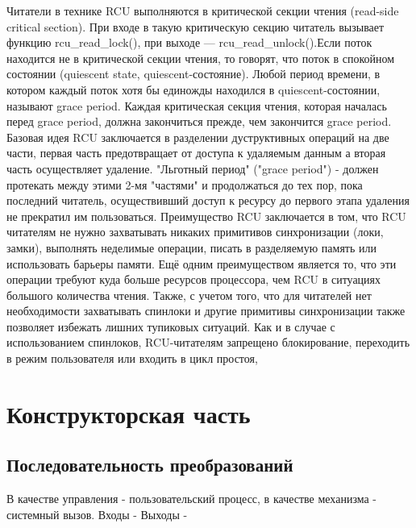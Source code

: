 \documentclass{bmstu}
\begin{document}
Читатели в технике RCU выполняются в критической секции чтения (read-side critical section). При входе в такую критическую секцию читатель вызывает функцию rcu\_read\_lock(), при выходе — rcu\_read\_unlock().Если поток находится не в критической секции чтения, то говорят, что поток в спокойном состоянии (quiescent state, quiescent-состояние). Любой период времени, в котором каждый поток хотя бы единожды находился в quiescent-состоянии, называют grace period. Каждая критическая секция чтения, которая началась перед grace period, должна закончиться прежде, чем закончится grace period.
Базовая идея RCU заключается в разделении дуструктивных операций на две части, первая часть предотвращает от доступа к удаляемым данным а вторая часть осуществляет удаление. "Льготный период" ("grace period") - должен протекать между этими 2-мя "частями" и продолжаться до тех пор, пока последний читатель, осуществивший доступ к ресурсу до первого этапа удаления не прекратил им пользоваться. 
Преимущество RCU заключается в том, что RCU читателям не нужно захватывать никаких примитивов синхронизации (локи, замки), выполнять неделимые операции, писать в разделяемую память или использовать барьеры памяти. Ещё одним преимуществом является то, что эти операции требуют куда больше ресурсов процессора, чем RCU в ситуациях большого количества чтения. Также, с учетом того, что для читателей нет необходимости захватывать спинлоки и другие примитивы синхронизации также позволяет избежать лишних тупиковых ситуаций.
Как и в случае с использованием спинлоков, RCU-читателям запрещено блокирование, переходить в режим пользователя или входить в цикл простоя, %


\chapter{Конструкторская часть}
\section{Последовательность преобразований}
В качестве управления - пользовательский процесс, в качестве механизма - системный вызов.
Входы - %
Выходы - %
\end{document}
